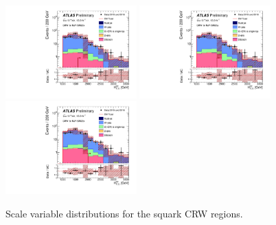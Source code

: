 \begin{figure}[tbp]
\begin{center}
\includegraphics[width=0.45\textwidth]{figures/ATLAS-CONF-2016-078_INT/N-1Plots/AtlasStyle/Preliminary/CRW_SRJigsawSRS2b_LastCut_CRW_minusone}
\includegraphics[width=0.45\textwidth]{figures/ATLAS-CONF-2016-078_INT/N-1Plots/AtlasStyle/Preliminary/CRW_SRJigsawSRS3a_LastCut_CRW_minusone}
\includegraphics[width=0.45\textwidth]{figures/ATLAS-CONF-2016-078_INT/N-1Plots/AtlasStyle/Preliminary/CRW_SRJigsawSRS3b_LastCut_CRW_minusone}
\end{center}
\caption{Scale variable distributions for the squark CRW regions.}
\label{fig:CRW_SRJigsawSRS1a_LastCut_CRW_minusone}
\end{figure}


\clearpage


